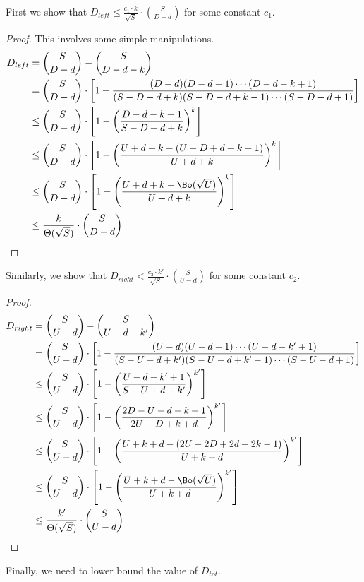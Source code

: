 \begin{lemma}
First we show that $D_{left} \le \frac{c_1\cdot k}{\sqrt{S}}\cdot{{S}\choose{D-d}}$ for some constant $c_1$.
\end{lemma}
\begin{proof}
This involves some simple manipulations.
\begin{align}
D_{left} &= {{S}\choose{D-d}}-{{S}\choose{D-d-k}}\\
&= {{S}\choose{D-d}}\cdot \left[1-\frac{(D-d)(D-d-1)\cdots(D-d-k+1)}{(S-D-d+k)(S-D-d+k-1)\cdots(S-D-d+1)}\right]\\
&\le {{S}\choose{D-d}}\cdot \left[1-\left(\frac{D-d-k+1}{S-D+d+k}\right)^k\right]\\
&\le {{S}\choose{D-d}}\cdot \left[1-\left(\frac{U+d+k-(U-D+d+k-1)}{U+d+k}\right)^k\right]\\
&\le {{S}\choose{D-d}}\cdot \left[1-\left(\frac{U+d+k-\Bo(\sqrt{U})}{U+d+k}\right)^k\right]\\
&\le \frac{k}{\Theta(\sqrt{S})}\cdot{{S}\choose{D-d}}
\end{align}
\end{proof}

\begin{lemma}
Similarly, we show that $D_{right} < \frac{c_2\cdot k'}{\sqrt{S}}\cdot{{S}\choose{U-d}}$ for some constant $c_2$.
\end{lemma}
\begin{proof}
\begin{align}
D_{right} &= {{S}\choose{U-d}}-{{S}\choose{U-d-k'}}\\
&= {{S}\choose{U-d}}\cdot \left[1-\frac{(U-d)(U-d-1)\cdots(U-d-k'+1)}{(S-U-d+k')(S-U-d+k'-1)\cdots(S-U-d+1)}\right]\\
&\le {{S}\choose{U-d}}\cdot \left[1-\left(\frac{U-d-k'+1}{S-U+d+k'}\right)^{k'}\right]\\
&\le {{S}\choose{U-d}}\cdot \left[1-\left(\frac{2D-U-d-k+1}{2U-D+k+d}\right)^{k'}\right]\\
&\le {{S}\choose{U-d}}\cdot \left[1-\left(\frac{U+k+d - (2U-2D+2d+2k-1)}{U+k+d}\right)^{k'}\right]\\
&\le {{S}\choose{U-d}}\cdot \left[1-\left(\frac{U+k+d - \Bo(\sqrt U)}{U+k+d}\right)^{k'}\right]\\
&\le \frac{k'}{\Theta(\sqrt{S})}\cdot{{S}\choose{U-d}}
\end{align}
\end{proof}

Finally, we need to lower bound the value of $D_{tot}$.

